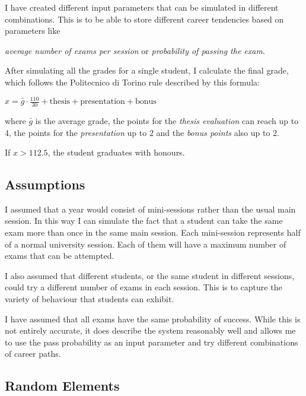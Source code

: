 \documentclass[conference]{IEEEtran}
\begin{document}
    I have created different input parameters that can be simulated in different combinations. 
    This is to be able to store different career tendencies based on parameters like {\textit{average number of exams per session} or \textit{probability of passing the exam}.

    After simulating all the grades for a single student, I calculate the final grade, which follows the Politecnico di Torino rule described by this formula:

    \begin{center}
        \begin{math}
            x = \bar{g} \cdot \frac{110}{30} + \text{thesis} + \text{presentation} + \text{bonus}
        \end{math}
    \end{center}

    where $\bar{g}$ is the average grade, the points for the \textit{thesis evaluation} can reach up to 4, the points for the \textit{presentation} up to 2 and the \textit{bonus points} also up to 2.

    If $x > 112.5$, the student graduates with honours.

    \subsection{Assumptions}

    I assumed that a year would consist of mini-sessions rather than the usual main session. 
    In this way I can simulate the fact that a student can take the same exam more than once in the same main session. 
    Each mini-session represents half of a normal university session.
    Each of them will have a maximum number of exams that can be attempted.

    I also assumed that different students, or the same student in different sessions, could try a different number of exams in each session. 
    This is to capture the variety of behaviour that students can exhibit.

    I have assumed that all exams have the same probability of success. 
    While this is not entirely accurate, it does describe the system reasonably well and allows me to use the pass probability as an input parameter and try different combinations of career paths.  
    

    \subsection{Random Elements}

}
\end{document}
